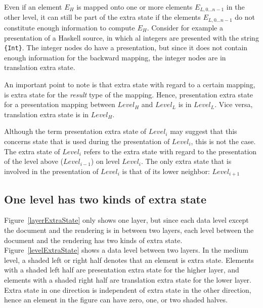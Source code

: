 Even if an element $E_H$ is mapped onto one or more elements $E_{L,0\dots n-1}$  in the other level, it can still be part of the extra state if the elements $E_{L,0\dots n-1}$ do not constitute enough information to compute $E_H$. Consider for example a presentation of a Haskell source, in which al integers are presented with the string \verb|{Int}|. The integer nodes do have a presentation, but since it does not contain enough information for the backward mapping, the integer nodes are in translation extra state.  

An important point to note is that extra state with regard to a certain mapping, is extra state for the {\em result} type of the mapping. Hence, presentation extra state for a presentation mapping between $Level_{H}$ and $Level_{L}$ is in $Level_{L}$. Vice versa, translation extra state is in $Level_{H}$.

\bc Although the term presentation extra state of $Level_i$ may suggest that this concerns state that is used during the presentation of $Level_i$, this is not the case. The extra state of $Level_i$ refers to the extra state with regard to the presentation of the level above ($Level_{i-1}$) on level $Level_i$. The only extra state that is involved in the presentation of $Level_i$ is that of its lower neighbor: $Level_{i+1}$
\ec


%																
\subsection{One level has two kinds of extra state} \label{sect:oneLevelDoubleES}

Figure~\ref{layerExtraState} only shows one layer, but since each data level except the document and the rendering is in between two layers, each level between the document and the rendering has two kinds of extra state. Figure~\ref{levelExtraState} shows a data level between two layers. In the medium level, a shaded left or right half denotes that an element is extra state. Elements with a shaded left half are presentation extra state for the higher layer, and elements with a shaded right half are translation extra state for the lower layer. Extra state in one direction is independent of extra state in the other direction, hence an element in the figure can have zero, one, or two shaded halves.

